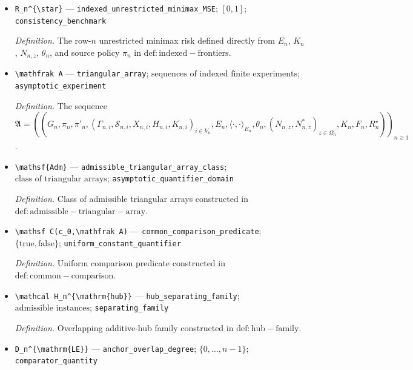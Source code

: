 \documentclass{article}
\begin{document}
\begin{itemize}
  \item \texttt{R\_\allowbreak{}n\textasciicircum{}\{\textbackslash{}\allowbreak{}star\}\allowbreak{}} --- \texttt{indexed\_\allowbreak{}unrestricted\_\allowbreak{}minimax\_\allowbreak{}MSE}; \([0,1]\); \texttt{consistency\_\allowbreak{}benchmark}
  \par\smallskip\noindent\emph{Definition.} The row-\(n\) unrestricted minimax risk defined directly from \(E_n\), \(K_n\), \(N_{n,z}\), \(\theta_n\), and source policy \(\pi_n\) in \(\mathrm{def:indexed-frontiers}\).
  \item \texttt{\textbackslash{}\allowbreak{}mathfrak A} --- \texttt{triangular\_\allowbreak{}array}; \(\text{sequences of indexed finite experiments}\); \texttt{asymptotic\_\allowbreak{}experiment}
  \par\smallskip\noindent\emph{Definition.} The sequence \(\mathfrak A=((G_n,\pi_n,\pi'_n,(\Gamma_{n,i},\mathcal S_{n,i},X_{n,i},H_{n,i},K_{n,i})_{i\in V_n},E_n,\langle\cdot,\cdot\rangle_{E_n},\theta_n,(N_{n,z},N_{n,z}^{\ast})_{z\in\Omega_n},K_n,F_n,R_n^{\star}))_{n\ge1}\).
  \item \texttt{\textbackslash{}\allowbreak{}mathsf\{Adm\}\allowbreak{}} --- \texttt{admissible\_\allowbreak{}triangular\_\allowbreak{}array\_\allowbreak{}class}; \(\text{class of triangular arrays}\); \texttt{asymptotic\_\allowbreak{}quantifier\_\allowbreak{}domain}
  \par\smallskip\noindent\emph{Definition.} Class of admissible triangular arrays constructed in \(\mathrm{def:admissible-triangular-array}\).
  \item \texttt{\textbackslash{}\allowbreak{}mathsf C(c\_\allowbreak{}0,\allowbreak{}\textbackslash{}\allowbreak{}mathfrak A)} --- \texttt{common\_\allowbreak{}comparison\_\allowbreak{}predicate}; \(\{\mathrm{true},\mathrm{false}\}\); \texttt{uniform\_\allowbreak{}constant\_\allowbreak{}quantifier}
  \par\smallskip\noindent\emph{Definition.} Uniform comparison predicate constructed in \(\mathrm{def:common-comparison}\).
  \item \texttt{\textbackslash{}\allowbreak{}mathcal H\_\allowbreak{}n\textasciicircum{}\{\textbackslash{}\allowbreak{}mathrm\{hub\}\allowbreak{}\}\allowbreak{}} --- \texttt{hub\_\allowbreak{}separating\_\allowbreak{}family}; \(\text{admissible instances}\); \texttt{separating\_\allowbreak{}family}
  \par\smallskip\noindent\emph{Definition.} Overlapping additive-hub family constructed in \(\mathrm{def:hub-family}\).
  \item \texttt{D\_\allowbreak{}n\textasciicircum{}\{\textbackslash{}\allowbreak{}mathrm\{LE\}\allowbreak{}\}\allowbreak{}} --- \texttt{anchor\_\allowbreak{}overlap\_\allowbreak{}degree}; \(\{0,\ldots,n-1\}\); \texttt{comparator\_\allowbreak{}quantity}

\end{itemize}
\end{document}
